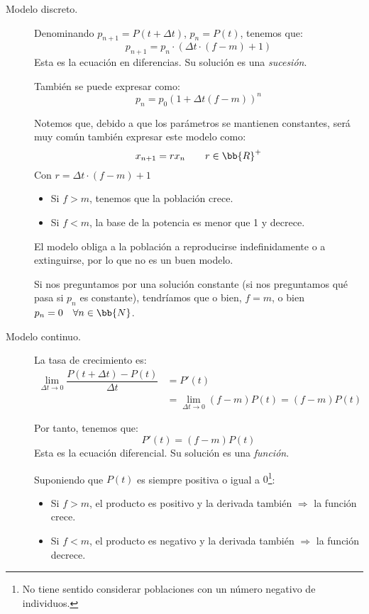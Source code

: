 \begin{description}
    \item[Modelo discreto.] Denominando $p_{n+1}=P(t+\Delta t)$, $p_n = P(t)$, tenemos que:
    \begin{equation*}
        p_{n+1} = p_n \cdot \left(\Delta t \cdot (f-m) + 1\right)
    \end{equation*}
    Esta es la ecuación en diferencias.
    Su solución es una \emph{sucesión}.

    También se puede expresar como:
    \begin{equation*}
        p_n = p_0 \left(1+\Delta t(f-m)\right)^n
    \end{equation*}

    Notemos que, debido a que los parámetros se mantienen constantes, será muy común también expresar este modelo como:
    \begin{equation*}
        x_{n+1} = rx_n \qquad r\in \bb{R}^+
    \end{equation*}
    Con $r = \Delta t\cdot (f-m)+1$

    \begin{itemize}
        \item Si $f > m$, tenemos que la población crece.
        \item Si $f < m$, la base de la potencia es menor que 1 y decrece.
    \end{itemize}
    El modelo obliga a la población a reproducirse indefinidamente o a extinguirse, por lo que no es un buen modelo.

    Si nos preguntamos por una solución constante (si nos preguntamos qué pasa si $p_n$ es constante), tendríamos que o bien, $f = m$, o bien $p_n = 0\quad \forall n \in \bb{N}$.

    \item[Modelo continuo.] La tasa de crecimiento es:
    \begin{align*}
        \lim_{\Delta t \to 0} \dfrac{P(t+\Delta t) - P(t)}{\Delta t} &= P'(t) \\
        &= \lim_{\Delta t \to 0} (f-m)P(t) = (f-m)P(t)
    \end{align*}

    Por tanto, tenemos que:
    \begin{equation*}
        P'(t) = (f-m)P(t)
    \end{equation*}
    Esta es la ecuación diferencial.
    Su solución es una \emph{función}.

    Suponiendo que $P(t)$ es siempre positiva o igual a $0$\footnote{No tiene sentido considerar poblaciones con un número negativo de individuos.}:
    \begin{itemize}
        \item Si $f > m$, el producto es positivo y la derivada también $\Rightarrow$ la función crece.
        \item Si $f < m$, el producto es negativo y la derivada también $\Rightarrow$ la función decrece.
    \end{itemize}
\end{description}

